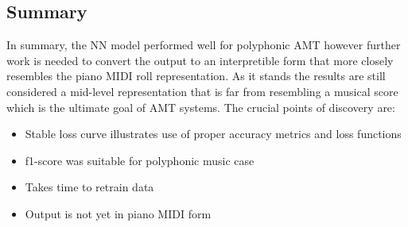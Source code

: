 \subsection{Summary}
In summary, the \ac{NN} model performed well for polyphonic AMT however further work
is needed to convert the output to an interpretible form that more closely resembles the piano \ac{MIDI} roll representation.
As it stands the results are still considered a mid-level representation that is far from
resembling a musical score which is the ultimate goal of AMT systems.
The crucial points of discovery are:
\begin{itemize}
    \item Stable loss curve illustrates use of proper accuracy metrics and loss functions
    \item f1-score was suitable for polyphonic music case
    \item Takes time to retrain data
    \item Output is not yet in piano MIDI form
\end{itemize}




